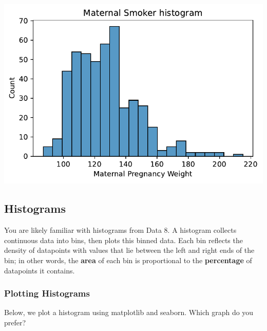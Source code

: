 \documentclass[
  letterpaper,
  DIV=11,
  numbers=noendperiod]{scrreprt}
\newenvironment{Shaded}{\begin{snugshade}}{\end{snugshade}}
\newcommand{\CommentTok}[1]{\textcolor[rgb]{0.37,0.37,0.37}{#1}}
\newcommand{\NormalTok}[1]{\textcolor[rgb]{0.00,0.23,0.31}{#1}}
\newcommand{\OperatorTok}[1]{\textcolor[rgb]{0.37,0.37,0.37}{#1}}
\newcommand{\StringTok}[1]{\textcolor[rgb]{0.13,0.47,0.30}{#1}}
\newcommand{\VariableTok}[1]{\textcolor[rgb]{0.07,0.07,0.07}{#1}}
\begin{document}
\includegraphics{visualization_1/visualization_1_files/figure-pdf/cell-13-output-1.pdf}

\subsection{Histograms}\label{histograms}

You are likely familiar with histograms from Data 8. A histogram
collects continuous data into bins, then plots this binned data. Each
bin reflects the density of datapoints with values that lie between the
left and right ends of the bin; in other words, the \textbf{area} of
each bin is proportional to the \textbf{percentage} of datapoints it
contains.

\subsubsection{Plotting Histograms}\label{plotting-histograms}

Below, we plot a histogram using matplotlib and seaborn. Which graph do
you prefer?

\begin{Shaded}
\end{Shaded}
\end{document}
